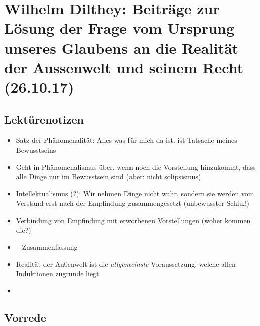 \documentclass[emulatestandardclasses]{scrartcl}
\begin{document}
\section{Wilhelm Dilthey: Beiträge zur Lösung der Frage vom Ursprung unseres Glaubens an die Realität der Aussenwelt und seinem Recht\\(26.10.17)}

\subsection{Lektürenotizen}

\begin{itemize}
  \item Satz der Phänomenalität: Alles was für mich da ist. ist Tatsache meines Bewusstseins
  \item Geht in Phänomenalismus über, wenn noch die Vorstellung hinzukommt, dass alle Dinge nur im Bewusstsein sind (aber: nicht solipsismus)
  \item Intellektualismus (?): Wir nehmen Dinge nicht wahr, sondern sie werden vom Verstand erst nach der Empfindung zusammengesetzt (unbewusster Schluß)
  \item Verbindung von Empfindung mit erworbenen Vorstellungen (woher kommen die?)
  \item -- Zusammenfassung --
  \item Realität der Au0enwelt ist die \emph{allgemeinste} Voraussetzung, welche allen Induktionen zugrunde liegt
  \item 
\end{itemize}

\subsection{Vorrede}
\end{document}
